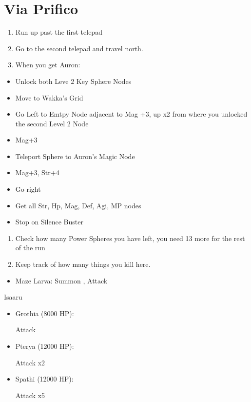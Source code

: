 \chapter{Via Prifico}

\begin{enumerate}
	\item Run up past the first telepad
	\item Go to the second telepad and travel north.
	\item When you get Auron:
\end{enumerate}
\begin{spheregrid}
\begin{itemize}
	\auronf
	\begin{itemize}
		\item Unlock both Leve 2 Key Sphere Nodes
		\item Move to Wakka's Grid
		\item Go Left to Emtpy Node adjacent to Mag +3, up x2 from where you unlocked the second Level 2 Node
		\item Mag+3
	\end{itemize}
	\yunaf
	\begin{itemize}
		\item Teleport Sphere to Auron's Magic Node
		\item Mag+3, Str+4
		\item Go right
		\item Get all Str, Hp, Mag, Def, Agi, MP nodes
		\item Stop on Silence Buster
	\end{itemize}
\end{itemize}
\end{spheregrid}
\begin{enumerate}[resume]
	\item Check how many Power Spheres you have left, you need 13 more for the rest of the run
	\item Keep track of how many things you kill here.
\end{enumerate}
\begin{encounters}
\begin{itemize}
	\item Maze Larva: Summon \ixilon, Attack
\end{itemize}
\end{encounters}
\begin{battle}{Isaaru}
\begin{itemize}
	\item Grothia (8000 HP):
	\begin{itemize}
		\summon{\bahamut}
		\bahamutf Attack
	\end{itemize}
	\item Pterya (12000 HP):
	\begin{itemize}
		\summon{\bahamut}
		\bahamutf Attack x2
	\end{itemize}
	\item Spathi (12000 HP):
	\begin{itemize}
		\summon{\ixilon}
		\ixilonf Attack x5
	\end{itemize}
\end{itemize}
\end{battle}
